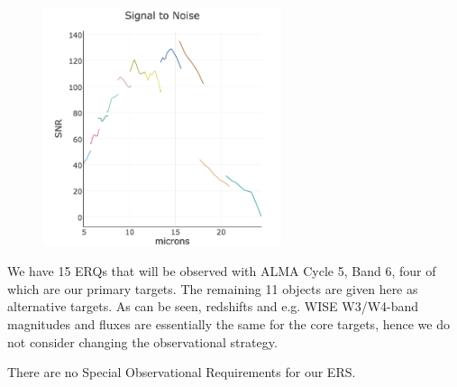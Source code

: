 \documentclass[12pt]{article}
\begin{document}
\hspace{-2.5cm}
\begin{figure}[h]
  \begin{center}
    \hspace{-0.5cm}
    \includegraphics[height=7.0cm,width=7.0cm]{../Figures/current_wavelength_vsSNR.png}
    \vspace{-10pt}
    \caption{       \footnotesize}
    \vspace{-14pt}
    \label{figtest-fig}
  \end{center}
\end{figure}




%
%
\alttargets   %
We have 15 ERQs that will be observed with ALMA Cycle 5, Band 6, four of which are
our primary targets. The remaining 11 objects are given here as alternative targets. 
As can be seen, redshifts and e.g. WISE W3/W4-band magnitudes and fluxes are
essentially the same for the core targets, hence we do not consider changing the
observational strategy. 



%
%
\specialreq             %
There are no Special Observational Requirements for our ERS. 

\end{document}

